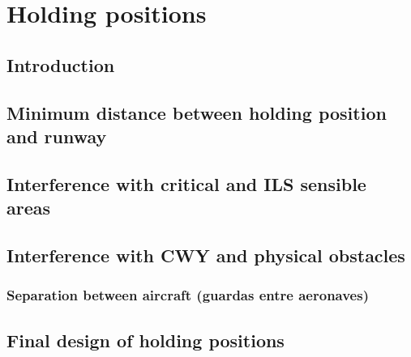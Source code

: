 	\chapter{Holding positions}
	
		\section{Introduction}
		\section{Minimum distance between holding position and runway}
		\section{Interference with critical and ILS sensible areas}
		\section{Interference with CWY and physical obstacles}
		\subsection{Separation between aircraft (guardas entre aeronaves)}
		\section{Final design of holding positions}